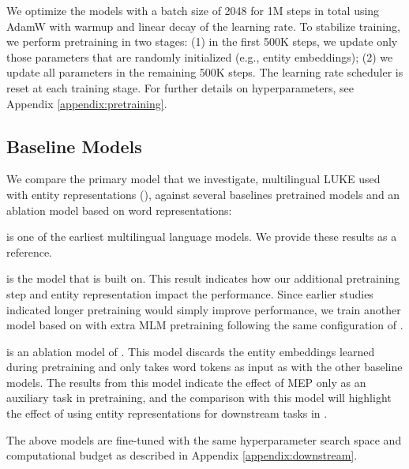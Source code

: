 \documentclass[11pt]{article}
\newcommand{\minisection}[1]{\noindent{\bf {#1}.}}
\newcommand{\minisectionNoDot}[1]{\noindent{\bf {#1}}}
\newcommand{\Appendix}[1]{Appendix \ref{#1}}
\begin{document}
\minisection{Optimization}
We optimize the models with a batch size of 2048 for 1M steps in total using AdamW \citep{DBLP:conf/iclr/LoshchilovH19} with warmup and linear decay of the learning rate.
To stabilize training, we perform pretraining in two stages: (1) in the first 500K steps, we update only those parameters that are randomly initialized (e.g., entity embeddings); (2) we update all parameters in the remaining 500K steps.
The learning rate scheduler is reset at each training stage.
For further details on hyperparameters, see \Appendix{appendix:pretraining}.

\subsection{Baseline Models}

We compare the primary model that we investigate, multilingual LUKE used with entity representations ({\bf \mlukeE{}}), against several baselines pretrained models and an ablation model based on word representations:

\minisectionNoDot{\mbert{}} \citep{devlin2018bert} is one of the earliest multilingual language models. We provide these results as a reference.

\minisectionNoDot{\xlmr{}} \citep{conneau-etal-2020-unsupervised} is the model that \mluke{} is built on.
This result indicates how our additional pretraining step and entity representation impact the performance.
Since earlier studies \citep{Liu2019RoBERTaAR,lan2019albert} indicated longer pretraining would simply improve performance, we train another model based on \xlmr{}\ba{} with extra MLM pretraining following the same configuration of \mluke{}.

\minisectionNoDot{\mlukeW{}} is an ablation model of \mlukeE.
This model discards the entity embeddings learned during pretraining and only takes word tokens as input as with the other baseline models.
The results from this model indicate the effect of MEP only as an auxiliary task in pretraining, and the comparison with this model will highlight the effect of using entity representations for downstream tasks in \mlukeE{}.

The above models are fine-tuned with the same hyperparameter search space and computational budget as described in \Appendix{appendix:downstream}.
\end{document}
